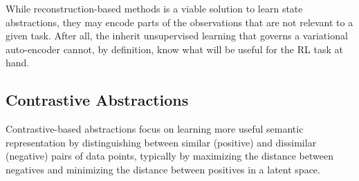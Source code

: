 


While reconstruction-based methods is a viable solution to learn state abstractions, they may encode parts of the observations that are not relevant to a given task. After all, the inherit unsupervised learning that governs a variational auto-encoder cannot, by definition, know what will be useful for the RL task at hand. 


\subsection{Contrastive Abstractions}

Contrastive-based abstractions focus on learning more useful semantic representation by distinguishing between similar (positive) and dissimilar (negative) pairs of data points, typically by maximizing the distance between negatives and minimizing the distance between positives in a latent space. %

